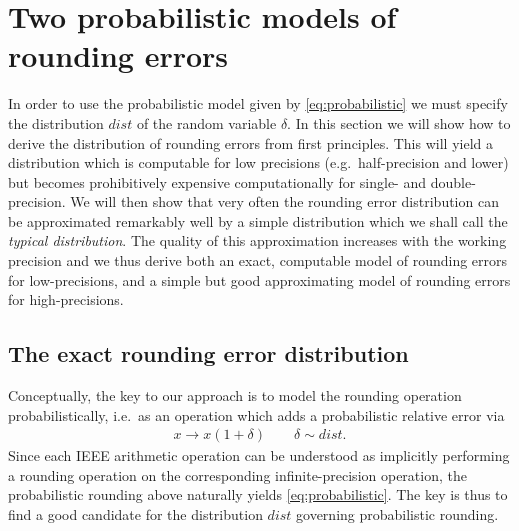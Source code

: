 \documentclass[10pt,conference]{IEEEtran}
\newcommand{\ie}{i.e.\ }
\newcommand{\eg}{e.g.\ }
\begin{document}
\section{Two probabilistic models of rounding errors}\label{sec:rounding}

In order to use the probabilistic model given by \cref{eq:probabilistic} we must specify the distribution $dist$ of the random variable $\delta$. In this section we will show how to derive the distribution of rounding errors from first principles. This will yield a distribution which is computable for low precisions (\eg half-precision and lower) but becomes prohibitively expensive computationally for single- and double-precision. We will then show that very often the rounding error distribution can be approximated remarkably well by a simple distribution which we shall call the \emph{typical distribution}. The quality of this approximation increases with the working precision and we thus derive both an exact, computable model of rounding errors for low-precisions, and a simple but good approximating model of rounding errors for high-precisions.

\subsection{The exact rounding error distribution}\label{subsec:error_dist}

Conceptually, the key to our approach is to model the rounding operation probabilistically, \ie as an operation which adds a probabilistic relative error via
\begin{align}
x \longrightarrow x(1+\delta)\qquad \delta\sim dist.\label{eq:rounding}
\end{align}
Since each IEEE arithmetic operation can be understood as implicitly performing a rounding operation on the corresponding infinite-precision operation, the probabilistic rounding above naturally yields \cref{eq:probabilistic}. The key is thus to find a good candidate for the distribution $dist$ governing probabilistic rounding.
\end{document}
